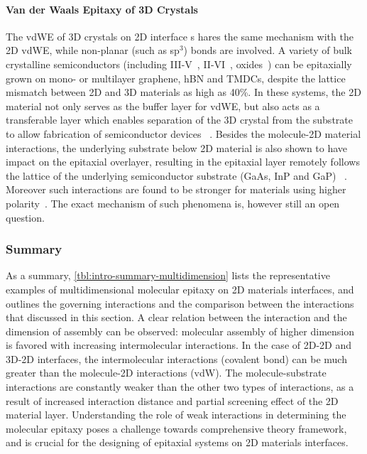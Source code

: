 \paragraph{Van der Waals Epitaxy of 3D Crystals}
\label{sec:orgeb0161b}

The vdWE of 3D crystals on 2D interface s
hares the same mechanism with the 2D
vdWE, while non-planar (such as sp\(^{\text{3}}\)) bonds are involved.
%
A variety of bulk crystalline semiconductors (including
III-V~\autocite{Alaskar_2015_GaAs_gr_Si_theor,Kim_2017_remote_epi_Gr,Nepal_2013_GaN_gr,Kim_2014_direct_vdw_GaN_gr,Makimoto_2012_InGaN_hBN},
II-VI~\autocite{Loeher_1994_vdw_epi_CdS_MoTe,Loeher_1996_CdTe_MoWTe},
oxides~\autocite{Oh_2014_ZnO_hBN,Chung_2010_GaN_ZnO_gr})
can be epitaxially grown on mono- or multilayer graphene, hBN and TMDCs, despite the lattice mismatch between 2D and 3D materials as high as 40\%.
%
In
these systems, the 2D material not only serves as the buffer layer for
vdWE, but also acts as a transferable layer which enables separation
of the 3D crystal from the substrate to allow fabrication of
semiconductor devices
~\autocite{Makimoto_2012_InGaN_hBN,Kobayashi_2012_GaN_hBN,Kim_2014_direct_vdw_GaN_gr,Kim_2017_remote_epi_Gr}.
%
Besides the molecule-2D material interactions, the underlying
substrate below 2D material is also shown to have impact on the
epitaxial overlayer, resulting in the epitaxial layer remotely follows
the  lattice of the underlying semiconductor substrate (GaAs, InP and GaP)
~\autocite{Kim_2017_remote_epi_Gr}. Moreover such interactions are found to be stronger for materials using higher polarity~\autocite{Kong_2018_vdw_polar}.
%
The exact mechanism of such phenomena is, however still an open question.


\subsubsection{Summary}
\label{sec:org0b4290f}

As a summary, \autoref{tbl:intro-summary-multidimension} lists the
representative examples of multidimensional molecular epitaxy on 2D
materials interfaces, and outlines the governing interactions and the
comparison between the interactions that discussed in this section. A
clear relation between the interaction and the dimension of assembly
can be observed: molecular assembly of higher dimension is favored
with increasing intermolecular interactions. In the case of 2D-2D and
3D-2D interfaces, the intermolecular interactions (covalent bond) can
be much greater than the molecule-2D interactions (vdW).
%
The molecule-substrate interactions are constantly
weaker than the other two types of interactions, as a result of
increased interaction distance and partial screening effect of the 2D
material layer. Understanding the role of weak interactions in
determining the molecular epitaxy poses a challenge towards
comprehensive theory framework, and is crucial for the designing of
epitaxial systems on 2D materials interfaces.


